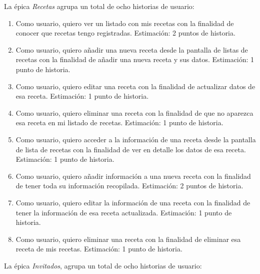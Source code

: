 La épica \textit{Recetas} agrupa un total de ocho historias de usuario:

\begin{enumerate}
  \item Como usuario, quiero ver un listado con mis recetas con la finalidad de conocer que recetas tengo registradas. Estimación: 2 puntos de historia.
  \item Como usuario, quiero añadir una nueva receta desde la pantalla de listas de recetas con la finalidad de añadir una nueva receta y sus datos. Estimación: 1 punto de historia.
  \item Como usuario, quiero editar una receta con la finalidad de actualizar datos de esa receta. Estimación: 1 punto de historia.
  \item Como usuario, quiero eliminar una receta con la finalidad de que no aparezca esa receta en mi listado de recetas. Estimación: 1 punto de historia.
  \item Como usuario, quiero acceder a la información de una receta desde la pantalla de lista de recetas con la finalidad de ver en detalle los datos de esa receta. Estimación: 1 punto de historia.
  \item Como usuario, quiero añadir información a una nueva receta con la finalidad de tener toda su información recopilada. Estimación: 2 puntos de historia.
  \item Como usuario, quiero editar la información de una receta con la finalidad de tener la información de esa receta actualizada. Estimación: 1 punto de historia.
  \item Como usuario, quiero eliminar una receta con la finalidad de eliminar esa receta de mis recetas. Estimación: 1 punto de historia.
\end{enumerate}

La épica \textit{Invitados}, agrupa un total de ocho historias de usuario:

